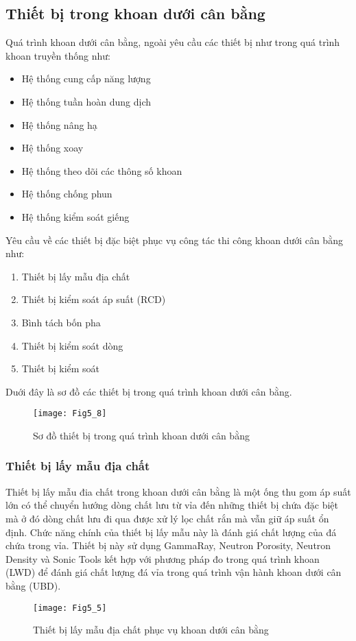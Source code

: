 \documentclass[12pt,a4paper]{article}
\begin{document}
\subsection{Thiết bị trong khoan dưới cân bằng}
Quá trình khoan dưới cân bằng, ngoài yêu cầu các thiết bị như trong quá trình khoan truyền thống như:
\begin{itemize}
	\item Hệ thống cung cấp năng lượng
	\item Hệ thống tuần hoàn dung dịch
	\item Hệ thống nâng hạ
	\item Hệ thống xoay
	\item Hệ thống theo dõi các thông số khoan
	\item Hệ thống chống phun
	\item Hệ thống kiểm soát giếng
\end{itemize}
Yêu cầu về các thiết bị đặc biệt phục vụ công tác thi công khoan dưới cân bằng như:
\begin{enumerate}
	\item[] Thiết bị lấy mẫu địa chất
	\item[] Thiết bị kiểm soát áp suất (RCD)
	\item[] Bình tách bốn pha
	\item[] Thiết bị kiểm soát dòng 
	\item[] Thiết bị kiểm soát

\end{enumerate}
Duới đây là sơ đồ các thiết bị trong quá trình khoan dưới cân bằng.
\begin{figure}[h]
\centering
\texttt{[image: Fig5\_8]}
\caption{Sơ đồ thiết bị trong quá trình khoan dưới cân bằng\cite{ramalho2007changing}}
\end{figure}


\subsubsection{Thiết bị lấy mẫu địa chất}
Thiết bị lấy mẫu đia chất trong khoan dưới cân bằng là một ống thu gom áp suất lớn có thể chuyển hướng dòng chất lưu từ vỉa đến những thiết bị chứa đặc biệt mà ở đó dòng chất lưu đi qua được xử lý lọc chất rắn mà vẫn giữ áp suất ổn định.
Chức năng chính của thiết bị lấy mẫu này là đánh giá chất lượng của đá chứa trong vỉa.
Thiết bị này sử dụng GammaRay, Neutron Porosity, Neutron Density và Sonic Tools kết hợp với phương pháp đo trong quá trình khoan (LWD) để đánh giá chất lượng đá vỉa trong quá trình vận hành khoan dưới cân bằng (UBD).
\begin{figure}
\centering
\texttt{[image: Fig5\_5]}
\caption{Thiết bị lấy mẫu địa chất phục vụ khoan dưới cân bằng\cite{rehm2013underbalanced}}
\end{figure}
\end{document}
